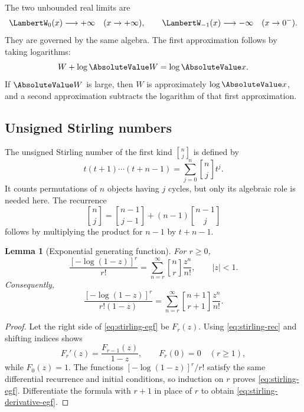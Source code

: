 \documentclass[11pt]{article}
\newtheorem{lemma}[lemma]{Lemma}
\theoremstyle{remark}
\newcommand{\Wz}{\LambertW_{0}}
\newcommand{\Wm}{\LambertW_{-1}}
\newcommand{\stirling}[2]{\genfrac{[}{]}{0pt}{}{#1}{#2}}
\begin{document}
The two unbounded real limits are
\[
       \Wz(x)\longrightarrow+\infty\quad(x\to+\infty),
       \qquad
       \Wm(x)\longrightarrow-\infty\quad(x\to0^-).
\]
They are governed by the same algebra.  The first approximation follows by
taking logarithms:
\[
       W+\log\AbsoluteValue W=\log\AbsoluteValue x.
\]
If \(\AbsoluteValue W\) is large, then \(W\) is approximately \(\log\AbsoluteValue x\), and a
second approximation subtracts the logarithm of that first approximation.

\subsection{Unsigned Stirling numbers}

The unsigned Stirling number of the first kind
\(\stirling{n}{j}\) is defined by
\begin{equation}\label{eq:stirling-def}
 t(t+1)\cdots(t+n-1)
 =\sum_{j=0}^n\stirling{n}{j}t^j.
\end{equation}
It counts permutations of \(n\) objects having \(j\) cycles, but only its
algebraic role is needed here.  The recurrence
\begin{equation}\label{eq:stirling-rec}
 \stirling{n}{j}
 =\stirling{n-1}{j-1}+(n-1)\stirling{n-1}{j}
\end{equation}
follows by multiplying the product for \(n-1\) by \(t+n-1\).

\begin{lemma}[Exponential generating function]\label{lem:stirling-egf}
For \(r\geq0\),
\begin{equation}\label{eq:stirling-egf}
 \frac{[-\log(1-z)]^r}{r!}
 =\sum_{n=r}^{\infty}\stirling{n}{r}\frac{z^n}{n!},
 \qquad |z|<1.
\end{equation}
Consequently,
\begin{equation}\label{eq:stirling-derivative-egf}
 \frac{[-\log(1-z)]^r}{r!(1-z)}
 =\sum_{n=r}^{\infty}
   \stirling{n+1}{r+1}\frac{z^n}{n!}.
\end{equation}
\end{lemma}

\begin{proof}
Let the right side of \eqref{eq:stirling-egf} be \(F_r(z)\).
Using \eqref{eq:stirling-rec} and shifting indices shows
\[
       F_r'(z)=\frac{F_{r-1}(z)}{1-z},\qquad F_r(0)=0
       \quad(r\geq1),
\]
while \(F_0(z)=1\).  The functions
\([-\log(1-z)]^r/r!\) satisfy the same differential recurrence and initial
conditions, so induction on \(r\) proves \eqref{eq:stirling-egf}.
Differentiate the formula with \(r+1\) in place of \(r\) to obtain
\eqref{eq:stirling-derivative-egf}.
\end{proof}
\end{document}
